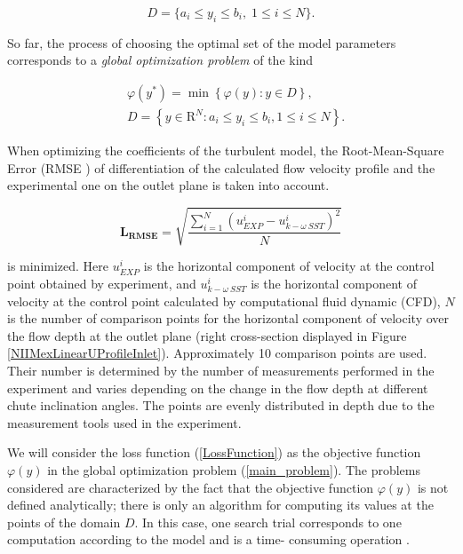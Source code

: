 \documentclass[mathematics,article,submit,pdftex,moreauthors]{Definitions/mdpi}
\begin{document}
\begin{linenomath}
\begin{equation}
D=\{a_i \leq y_i \leq b_i, \; 1 \leq i \leq N\}.
\end{equation}
\end{linenomath}

So far, the process of choosing the optimal set of the model parameters corresponds to a \textit{global optimization problem} of the kind

\begin{linenomath}
\begin{equation}\label{main_problem}
\begin{aligned}
    & \varphi(y^\ast)=\min{\left\{\varphi(y):y\in D\right\}},\\
    & D=\left\{y\in \text{R}^N: a_i\leq y_i \leq b_i, 1\leq i \leq N\right\}.
\end{aligned}
\end{equation}
\end{linenomath}

When optimizing the coefficients of the turbulent model, the Root-Mean-Square Error (RMSE    ) of differentiation of the calculated flow velocity profile and the experimental one on the outlet plane is taken into account.

\begin{linenomath}
\begin{equation}
	\label{LossFunction}
	\boldsymbol{L_{RMSE}} = \sqrt{\frac{\sum\limits_{i=1}^{N} \left( u_{EXP}^i - u_{k-\omega\ SST}^i \right)^2}{N}}
\end{equation}
\end{linenomath}
is minimized. 
Here  $u_{EXP}^i$ is the horizontal component of velocity at the control point obtained by experiment, and $u_{k-\omega\ SST}^i$  is the horizontal component of velocity at the control point calculated by computational fluid dynamic (CFD), $N$ is the number of comparison points for the horizontal component of velocity over the flow depth at the outlet plane (right cross-section displayed in Figure \ref{NIIMexLinearUProfileInlet}). Approximately 10 comparison points are used. Their number is determined by the number of measurements performed in the experiment and varies depending on the change in the flow depth at different chute inclination angles. The points are evenly distributed in depth due to the measurement tools used in the experiment.

We will consider the loss function (\ref{LossFunction}) as the objective function $\varphi(y)$ in the global optimization problem (\ref{main_problem}). 
The problems considered are characterized by the fact that the objective function $\varphi(y)$ is not defined analytically; there is only an algorithm for computing its values at the points of the domain $D$. In this case, one search trial corresponds to one computation according to the model and is a time- consuming operation \cite{Kalyulin2017,Paulavicius2020}.
\end{document}

